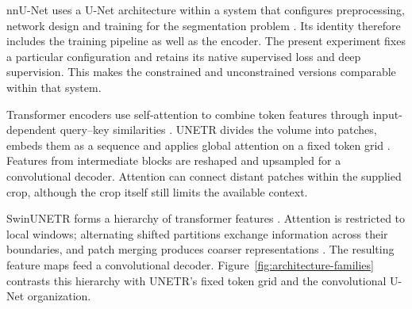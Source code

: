 \documentclass[12pt,a4paper]{article}
\begin{document}
nnU-Net uses a U-Net architecture within a system that configures
preprocessing, network design and training for the segmentation problem
\cite{isensee2021nnunet}. Its identity therefore includes the training
pipeline as well as the encoder. The present experiment fixes a particular
configuration and retains its native supervised loss and deep supervision.
This makes the constrained and unconstrained versions comparable within
that system.

Transformer encoders use self-attention to combine token features through
input-dependent query--key similarities \cite{vaswani2017attention}.
UNETR divides the volume into patches, embeds them as a sequence and
applies global attention on a fixed token grid
\cite{hatamizadeh2021unetr}. Features from intermediate blocks are
reshaped and upsampled for a convolutional decoder. Attention can connect
distant patches within the supplied crop, although the crop itself still
limits the available context.

SwinUNETR forms a hierarchy of transformer features
\cite{hatamizadeh2022swin}. Attention is restricted to local windows;
alternating shifted partitions exchange information across their
boundaries, and patch merging produces coarser representations
\cite{liu2021swin}. The resulting feature maps feed a convolutional
decoder. Figure~\ref{fig:architecture-families} contrasts this hierarchy
with UNETR's fixed token grid and the convolutional U-Net organization.
\end{document}
